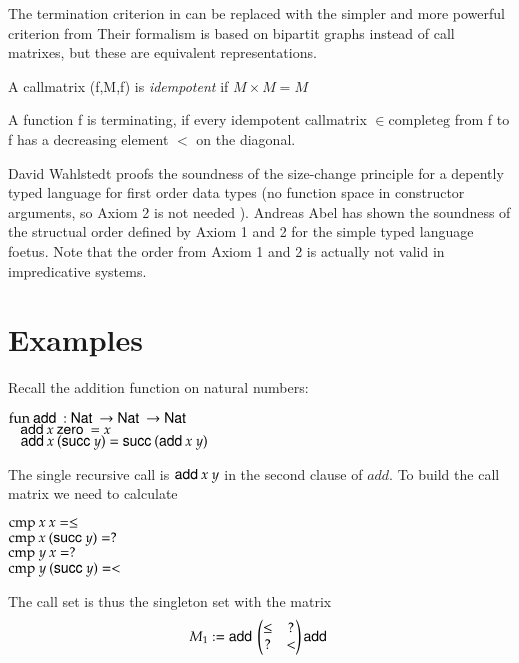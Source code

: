 The termination criterion in \cite{abelAltenkirch:predStRec} can be replaced with the
simpler and more powerful criterion from \cite{lee01sizechange}
Their formalism is based on bipartit graphs instead of call matrixes, but these are
equivalent representations.

\begin{definition}
A callmatrix (f,M,f) is \emph{idempotent} if $ M \times M = M $ 
\end{definition}

\begin{definition}
A function f is terminating, if every idempotent callmatrix  $ \in \mathrm{complete g} $ from f to f has a decreasing element $<$ on
the diagonal.
\end{definition}

David Wahlstedt proofs the soundness of the size-change principle for a depently typed language 
for first order data types (no function space in constructor arguments, so Axiom 2 is not needed ).
Andreas Abel has shown the soundness of the structual order defined by Axiom 1 and 2 for the simple typed
language foetus.
Note that the order from Axiom 1 and 2 is actually not valid in impredicative systems.





\section{Examples}

Recall the addition function on natural numbers:

\begin{bsp}
$\mathrm{fun}\: \mathsf{add}\: : \mathsf{Nat}\: \rightarrow \mathsf{Nat}\: \rightarrow \mathsf{Nat}\:$\\
$\hspace*{3mm} \mathsf{add}\: x \: \mathsf{zero}\: = x $\\
$\hspace*{3mm} \mathsf{add}\: x \: (\mathsf{succ}\: y) = \mathsf{succ}\: (\mathsf{add}\: x \: y)  $
\end{bsp}
The single recursive call is $\mathsf{add}\: x \: y$ in the second clause of $add$.
To build the call matrix we need to calculate
\begin{bsp}
$\mathrm{cmp}\: x \: x = \leq $\\
$\mathrm{cmp}\: x \: (\mathsf{succ}\: y) = ? $\\
$\mathrm{cmp}\: y \: x = ? $\\
$\mathrm{cmp}\: y \: (\mathsf{succ}\: y) = < $ 
\end{bsp}

The call set is thus the singleton set with the matrix
\[
M_1 := \mathsf{add}\:\begin{pmatrix}
\leq & ? \\
?    & < \\
\end{pmatrix}\mathsf{add}\:
\]

